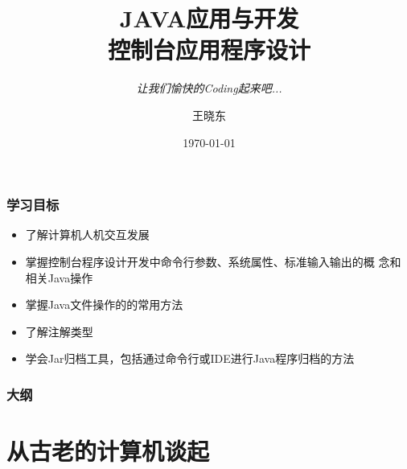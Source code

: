 
\title{\hei JAVA应用与开发\\  控制台应用程序设计}
\subtitle{\it 让我们愉快的Coding起来吧...}
\author{王晓东}
\date{\today}


\begin{frame}
  \maketitle
\end{frame}

\begin{frame}
  \frametitle{学习目标}
  \begin{itemize}
  \item 了解计算机人机交互发展
  \item 掌握控制台程序设计开发中命令行参数、系统属性、标准输入输出的概
    念和相关Java操作
  \item 掌握Java文件操作的的常用方法
  \item 了解注解类型
  \item 学会Jar归档工具，包括通过命令行或IDE进行Java程序归档的方法
  \end{itemize}
\end{frame}

\begin{frame}
  \frametitle{大纲}
  \tableofcontents
\end{frame}

\section{从古老的计算机谈起}

